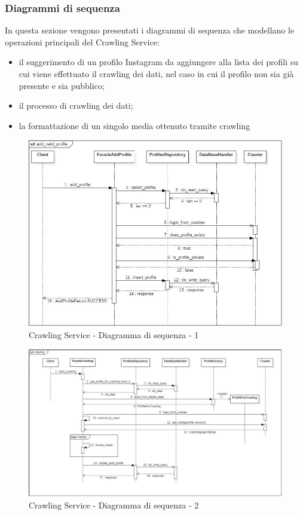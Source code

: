\subsubsection{Diagrammi di sequenza}
In questa sezione vengono presentati i diagrammi di sequenza che modellano le operazioni principali del Crawling Service:
\begin{itemize}
    \item il suggerimento di un profilo Instagram da aggiungere alla lista dei profili su cui viene effettuato il crawling dei dati, nel caso in cui il profilo non sia già presente e sia pubblico;
    \item il processo di crawling dei dati;
    \item la formattazione di un singolo media ottenuto tramite crawling
\end{itemize}
\begin{figure}[!htp]
    \centering
    \includegraphics[scale=0.65]{Contenuto/Immagini/seq1-CS.JPG}
    \caption{Crawling Service - Diagramma di sequenza - 1}
\end{figure}
\begin{figure}[H]
    \centerfloat
    \includegraphics[scale=0.55]{Contenuto/Immagini/seq2-CS.png}
    \caption{Crawling Service - Diagramma di sequenza - 2}
\end{figure}
